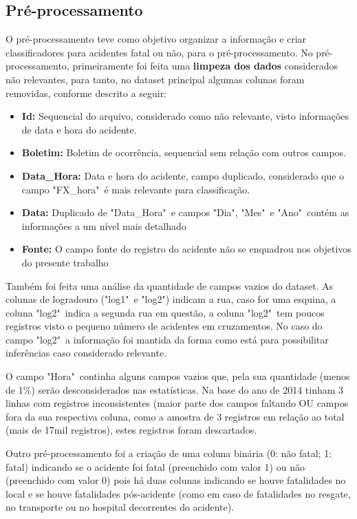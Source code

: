 \documentclass[11pt,article,oneside,a4paper]{abntex2}
\begin{document}
\subsection{Pré-processamento}
\label{subsec:preprocess}

O pré-processamento teve como objetivo organizar a informação e criar classificadores para acidentes fatal ou não, para o pré-processamento. No pré-processamento, primeiramente foi feita uma \textbf{limpeza dos dados} considerados não relevantes, para tanto, no dataset principal algumas colunas foram removidas, conforme descrito a seguir:

\begin{itemize}
	\item \textbf{Id:} Sequencial do arquivo, considerado como não relevante, visto informações de data e hora do acidente.
	\item \textbf{Boletim:} Boletim de ocorrência, sequencial sem relação com outros campos.
	\item \textbf{Data\_Hora:} Data e hora do acidente, campo duplicado, considerado que o campo "FX\_hora"\ é mais relevante para classificação.
	\item \textbf{Data:} Duplicado de "Data\_Hora"\ e campos "Dia", "Mes"\ e "Ano"\ contém as informações a um nível mais detalhado
	\item \textbf{Fonte:} O campo fonte do registro do acidente não se enquadrou nos objetivos do presente trabalho
\end{itemize}

Também foi feita uma análise da quantidade de campos vazios do dataset. As colunas de logradouro ("log1"\ e "log2") indicam a rua, caso for uma esquina, a coluna "log2"\ indica a segunda rua em questão, a coluna "log2"\ tem poucos registros visto o pequeno número de acidentes em cruzamentos. No caso do campo "log2"\ a informação foi mantida da forma como está para possibilitar inferências caso considerado relevante.

O campo "Hora"\ continha alguns campos vazios que, pela sua quantidade (menos de 1\%) serão desconsiderados nas estatísticas. Na base do ano de 2014 tinham 3 linhas com registros inconsistentes (maior parte dos campos faltando OU campos fora da sua respectiva coluna, como a amostra de 3 registros em relação ao total (mais de 17mil registros), estes registros foram descartados.

Outro pré-processamento foi a criação de uma coluna binária (0: não fatal; 1: fatal) indicando se o acidente foi fatal (preenchido com valor 1) ou não  (preenchido com valor 0) pois há duas colunas indicando se houve fatalidades no local e se houve fatalidades pós-acidente (como em caso de fatalidades no resgate, no transporte ou no hospital decorrentes do acidente).
\end{document}
